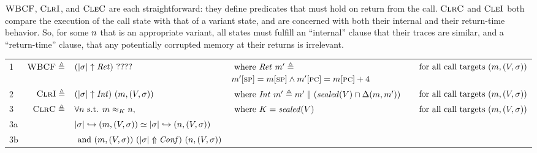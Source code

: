 \documentclass[10pt,conference]{ieeetran}%
\theoremstyle{definition}
\begin{document}
\(\textnormal{\sc WBCF}\), \(\textnormal{\sc ClrI}\), and \(\textnormal{\sc CleC}\) are each straightforward: they define predicates that must
hold on return from the call. \(\textnormal{\sc ClrC}\) and \(\textnormal{\sc CleI}\) both compare the execution of the
call state with that of a variant state, and are concerned with both their internal and
their return-time behavior. So, for some \(n\) that is an appropriate variant,
all states must fulfill an ``internal'' clause that their traces are similar,
and a ``return-time'' clause, that any potentially corrupted memory at their returns
is irrelevant.

\begin{table}[h]
  \setlength{\tabcolsep}{1pt}
  \center
  \begin{tabular}{l r l l l}
    \rowcolor{black!20}
    1
    & \(\textnormal{\sc WBCF} \triangleq\) & \((|\sigma| \uparrow \mathit{Ret}) ~ ????\)
    & \(\textnormal{ where } \mathit{Ret} ~ m' \triangleq \)
    \(m'[\textsc{sp}] = m[\textsc{sp}] \land m'[\textsc{pc}] = m[\textsc{pc}]+4\)
    & \(\textnormal{ for all call targets } (m,(V,\sigma))\) \\
    \rowcolor{black!10}
    2
    & \(\textnormal{\sc ClrI} \triangleq\) & \((|\sigma| \uparrow \mathit{Int}) ~ (m,(V,\sigma))\)
    & \(\textnormal{ where } \mathit{Int} ~ m' \triangleq
    m' \parallel (\mathit{sealed}(V) \cap \Delta(m,m'))\)
    & \(\textnormal{ for all call targets } (m,(V,\sigma))\) \\
    \rowcolor{black!20}
    3
    & \(\textnormal{\sc ClrC} \triangleq\) & \(\forall n \textnormal{ s.t. } m \approx_{K} n,\)
    & \(\textnormal{ where } K = \mathit{sealed}(V)\)
    & \(\textnormal{ for all call targets } (m,(V,\sigma))\) \\
    \rowcolor{black!20}
    3a & & \(|\sigma| \hookrightarrow (m,(V,\sigma)) \simeq |\sigma| \hookrightarrow (n,(V,\sigma))\) & & \\
    \rowcolor{black!20}
    3b & & \(\textnormal{ and } (m,(V,\sigma)) ~ (|\sigma| \Uparrow \mathit{Conf}) ~ (n,(V,\sigma))\)
    & \(\textnormal{ where } (\mach' ~ \confProp ~ \nach') \triangleq

\end{tabular}
\end{table}
\end{document}
